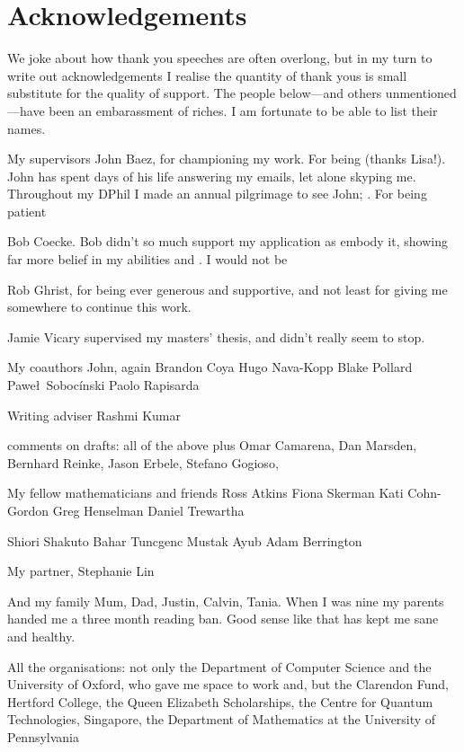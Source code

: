 \section*{Acknowledgements}

We joke about how thank you speeches are often overlong, but in my turn to write
out acknowledgements I realise the quantity of thank yous is small substitute
for the quality of support. The people below---and others unmentioned---have
been an embarassment of riches. I am fortunate to be able to list their names.

My supervisors
John Baez, for championing my work. For being (thanks Lisa!). John has spent
days of his life answering my emails, let alone skyping me. Throughout my DPhil
I made an annual pilgrimage to see John; . For being patient

Bob Coecke. Bob didn't so much support my application as embody it, showing far
more belief in my abilities and . I would not be

Rob Ghrist, for being ever generous and supportive, and not least for giving me
somewhere to continue this work.

Jamie Vicary supervised my masters' thesis, and didn't really seem to stop. 

My coauthors
John, again
Brandon Coya
Hugo Nava-Kopp
Blake Pollard
Pawe\l\ Soboc\'inski
Paolo Rapisarda

Writing adviser Rashmi Kumar

comments on drafts:
all of the above plus Omar Camarena, Dan Marsden, Bernhard Reinke, Jason Erbele, Stefano
Gogioso,

My fellow mathematicians and friends
Ross Atkins
Fiona Skerman
Kati Cohn-Gordon
Greg Henselman 
Daniel Trewartha

Shiori Shakuto
Bahar Tuncgenc
Mustak Ayub
Adam Berrington


My partner, Stephanie Lin

And my family Mum, Dad, Justin, Calvin, Tania. When I was nine my parents handed
me a three month reading ban. Good sense like that has kept me sane and healthy.

All the organisations: not only the Department of Computer Science and the
University of Oxford, who gave me space to work and, but the Clarendon Fund,
Hertford College, the Queen Elizabeth Scholarships, the Centre for Quantum
Technologies, Singapore, the Department of Mathematics at the University of Pennsylvania


